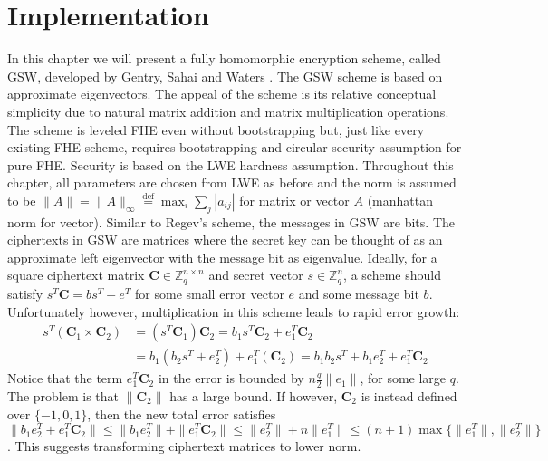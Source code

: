 \chapter{Implementation}


In this chapter we will present a fully homomorphic encryption scheme, called GSW, developed by Gentry, Sahai and Waters \cite{GSW13}. The GSW scheme is based on approximate eigenvectors. The appeal of the scheme is its relative conceptual simplicity due to natural matrix addition and matrix multiplication operations. The scheme is leveled FHE even without bootstrapping but, just like every existing FHE scheme, requires bootstrapping and circular security assumption for pure FHE. Security is based on the LWE hardness assumption. Throughout this chapter, all parameters are chosen from LWE as before and the norm is assumed to be $\|A\| = \|A\|_{\infty} \stackrel{\mathrm{def}}{=} \max_{i} \sum_{j} |a_{i j}|$ for matrix or vector $A$ (manhattan norm for vector). Similar to Regev's scheme, the messages in GSW are bits. The ciphertexts in GSW are matrices where the secret key can be thought of as an approximate left eigenvector with the message bit as eigenvalue. Ideally, for a square ciphertext matrix $\textbf{C} \in \mathbb{Z}_q^{n \times n}$ and secret vector $s \in \mathbb{Z}_q^n$, a scheme should satisfy $s^T\textbf{C} = bs^T + e^T$ for some small error vector $e$ and some message bit $b$. Unfortunately however, multiplication in this scheme leads to rapid error growth:
\begin{equation*}
    \begin{aligned}
    s^T(\textbf{C}_1 \times \textbf{C}_2) &= (s^T\textbf{C}_1)\textbf{C}_2 = b_1s^T\textbf{C}_2 + e_1^T\textbf{C}_2 \\
    &= b_1(b_2s^T + e_2^T) + e_1^T(\textbf{C}_2) = b_1b_2s^T + b_1e_2^T + e_1^T\textbf{C}_2
    \end{aligned}
\end{equation*}
Notice that the term $e_1^T\textbf{C}_2$ in the error is bounded by $n\frac{q}{2}\|e_1\|$, for some large $q$. The problem is that $\| \textbf{C}_2 \|$ has a large bound. If however, $\textbf{C}_2$ is instead defined over $\{-1,0,1\}$, then the new total error satisfies $\| b_1e_2^T + e_1^T\textbf{C}_2 \| \leq \| b_1e_2^T \| + \|e_1^T\textbf{C}_2\| \leq \|e_2^T\| + n\|e_1^T\| \leq (n+1) \max\{ \| e_1^T \| ,\|e_2^T\|\}$. This suggests transforming ciphertext matrices to lower norm. 

